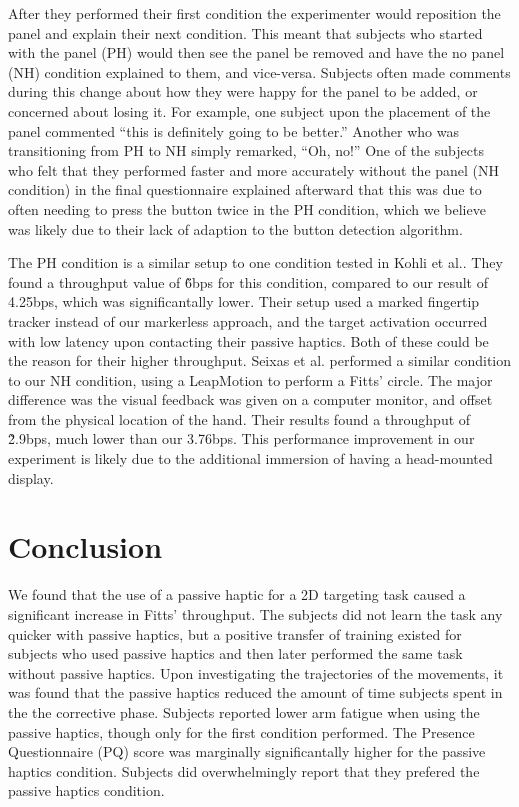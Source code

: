 After they performed their first condition the experimenter would reposition the panel and explain their next condition.
This meant that subjects who started with the panel (PH) would then see the panel be removed and have the no panel (NH) condition explained to them, and vice-versa.
Subjects often made comments during this change about how they were happy for the panel to be added, or concerned about losing it.
For example, one subject upon the placement of the panel commented ``this is definitely going to be better.''
Another who was transitioning from PH to NH simply remarked, ``Oh, no!''
One of the subjects who felt that they performed faster and more accurately without the panel (NH condition) in the final questionnaire explained afterward that this was due to often needing to press the button twice in the PH condition, which we believe was likely due to their lack of adaption to the button detection algorithm.

The PH condition is a similar setup to one condition tested in Kohli et al.\cite{kohli_redirected_2012}.
They found a throughput value of \~6bps for this condition, compared to our result of 4.25bps, which was significantally lower.
Their setup used a marked fingertip tracker instead of our markerless approach, and the target activation occurred with low latency upon contacting their passive haptics.
Both of these could be the reason for their higher throughput.
Seixas et al. \cite{seixas_one_2015} performed a similar condition to our NH condition, using a LeapMotion to perform a Fitts' circle.
The major difference was the visual feedback was given on a computer monitor, and offset from the physical location of the hand.
Their results found a throughput of \~2.9bps, much lower than our 3.76bps.
This performance improvement in our experiment is likely due to the additional immersion of having a head-mounted display.

\section{Conclusion}

We found that the use of a passive haptic for a 2D targeting task caused a significant increase in Fitts' throughput.
The subjects did not learn the task any quicker with passive haptics, but a positive transfer of training existed for subjects who used passive haptics and then later performed the same task without passive haptics.
Upon investigating the trajectories of the movements, it was found that the passive haptics reduced the amount of time subjects spent in the the corrective phase.
Subjects reported lower arm fatigue when using the passive haptics, though only for the first condition performed.
The Presence Questionnaire (PQ) score was marginally significantally higher for the passive haptics condition.
Subjects did overwhelmingly report that they prefered the passive haptics condition.

